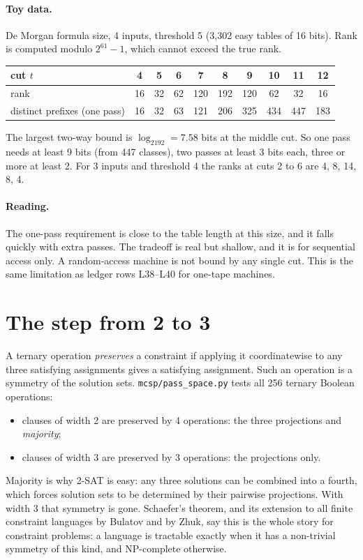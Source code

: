 \documentclass[11pt]{article}
\begin{document}
\paragraph{Toy data.} De Morgan formula size, 4 inputs, threshold 5 (3{,}302 easy tables of 16 bits). Rank is computed modulo $2^{61}-1$, which cannot exceed the true rank.
\begin{center}
\begin{tabular}{l|ccccccccc}
cut $t$ & 4 & 5 & 6 & 7 & 8 & 9 & 10 & 11 & 12\\\hline
rank & 16 & 32 & 62 & 120 & 192 & 120 & 62 & 32 & 16\\
distinct prefixes (one pass) & 16 & 32 & 63 & 121 & 206 & 325 & 434 & 447 & 183
\end{tabular}
\end{center}
The largest two-way bound is $\log_2192=7.58$ bits at the middle cut. So one pass needs at least 9 bits (from 447 classes), two passes at least 3 bits each, three or more at least 2. For 3 inputs and threshold 4 the ranks at cuts 2 to 6 are 4, 8, 14, 8, 4.

\paragraph{Reading.} The one-pass requirement is close to the table length at this size, and it falls quickly with extra passes. The tradeoff is real but shallow, and it is for sequential access only. A random-access machine is not bound by any single cut. This is the same limitation as ledger rows L38--L40 for one-tape machines.

\section{The step from 2 to 3}
A ternary operation \emph{preserves} a constraint if applying it coordinatewise to any three satisfying assignments gives a satisfying assignment. Such an operation is a symmetry of the solution sets. \texttt{mcsp/pass\_space.py} tests all 256 ternary Boolean operations:
\begin{itemize}
\item clauses of width 2 are preserved by 4 operations: the three projections and \emph{majority};
\item clauses of width 3 are preserved by 3 operations: the projections only.
\end{itemize}
Majority is why 2-SAT is easy: any three solutions can be combined into a fourth, which forces solution sets to be determined by their pairwise projections. With width 3 that symmetry is gone. Schaefer's theorem, and its extension to all finite constraint languages by Bulatov and by Zhuk, say this is the whole story for constraint problems: a language is tractable exactly when it has a non-trivial symmetry of this kind, and NP-complete otherwise.
\end{document}
